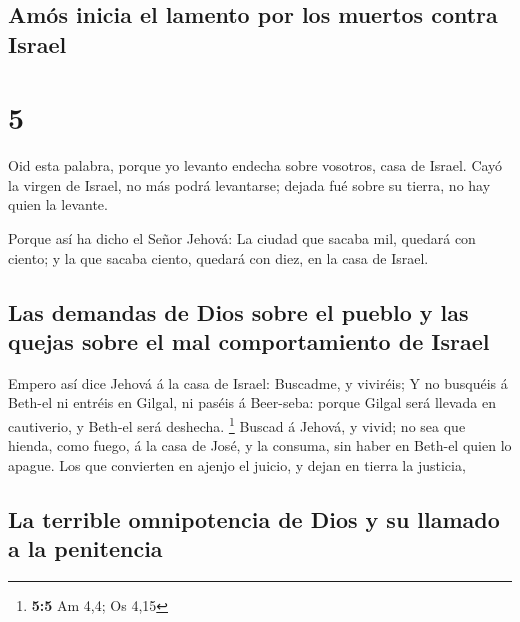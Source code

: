 \hypertarget{amuxf3s-inicia-el-lamento-por-los-muertos-contra-israel}{%
\subsection{Amós inicia el lamento por los muertos contra
Israel}\label{amuxf3s-inicia-el-lamento-por-los-muertos-contra-israel}}

\hypertarget{section-4}{%
\section{5}\label{section-4}}

 Oid esta palabra, porque yo levanto endecha sobre
vosotros, casa de Israel.  Cayó la virgen de Israel, no
más podrá levantarse; dejada fué sobre su tierra, no hay quien la
levante.

 Porque así ha dicho el Señor Jehová: La ciudad que sacaba
mil, quedará con ciento; y la que sacaba ciento, quedará con diez, en la
casa de Israel.

\hypertarget{las-demandas-de-dios-sobre-el-pueblo-y-las-quejas-sobre-el-mal-comportamiento-de-israel}{%
\subsection{Las demandas de Dios sobre el pueblo y las quejas sobre el
mal comportamiento de
Israel}\label{las-demandas-de-dios-sobre-el-pueblo-y-las-quejas-sobre-el-mal-comportamiento-de-israel}}

 Empero así dice Jehová á la casa de Israel: Buscadme, y
viviréis;  Y no busquéis á Beth-el ni entréis en Gilgal,
ni paséis á Beer-seba: porque Gilgal será llevada en cautiverio, y
Beth-el será deshecha. \footnote{\textbf{5:5} Am 4,4; Os 4,15}
 Buscad á Jehová, y vivid; no sea que hienda, como fuego,
á la casa de José, y la consuma, sin haber en Beth-el quien lo apague.
 Los que convierten en ajenjo el juicio, y dejan en tierra
la justicia,

\hypertarget{la-terrible-omnipotencia-de-dios-y-su-llamado-a-la-penitencia}{%
\subsection{La terrible omnipotencia de Dios y su llamado a la
penitencia}\label{la-terrible-omnipotencia-de-dios-y-su-llamado-a-la-penitencia}}

